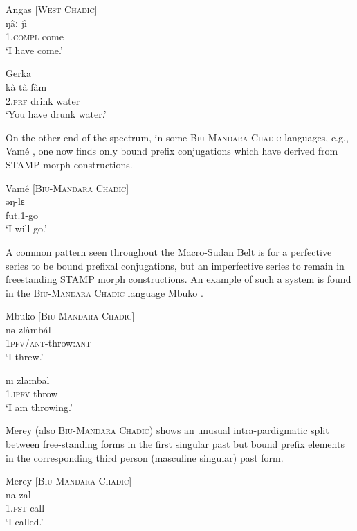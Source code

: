 \documentclass[output=paper]{langsci/langscibook}
\begin{document}
\ea\label{ex:anderson:41}
Angas  \citep[38]{Burquest1973}         [\textsc{West Chadic]}\\
\gll ŋâː    jì\\
1.\textsc{compl}  come\\
\glt  `I have come.'
\z

\ea\label{ex:anderson:42}
Gerka  \citep[173]{Jungraithmayr1968}\\
\gll kà  tà  ƒàm\\
\textsc{2.prf}  drink  water\\
\glt `You have drunk water.'
\z

On the other end of the spectrum, in some \textsc{Biu-Mandara Chadic} languages, e.g., Vamé , one now finds only bound prefix conjugations which have derived from STAMP morph constructions. 

\ea\label{ex:anderson:43}
Vamé  \citep[11]{Kinnaird2006}          [\textsc{Biu-Mandara Chadic}]\\
\gll əŋ-lɛ\\
fut.1-go\\
\glt `I will go.'
\z

A common pattern seen throughout the Macro-Sudan Belt is for a perfective series to be bound prefixal conjugations, but an imperfective series to remain in freestanding STAMP morph constructions. An example of such a system is found in the \textsc{Biu-Mandara Chadic} language Mbuko .

\ea\label{ex:anderson:44}
Mbuko  \citep[7]{Gravina2001}           [\textsc{Biu-Mandara Chadic}]\\
\ea\label{ex:anderson:44a}
\gll nə-zlàmbál    \\
  1\textsc{pfv/ant}-throw:\textsc{ant} \\
\glt `I threw.'    

\ex \label{ex:anderson:44b}
\gll n\={i}  zl\={a}mb\={a}l\\
\textsc{1.ipfv}  throw\\
\glt `I am throwing.'  
\z
\z

Merey (also \textsc{Biu-Mandara Chadic}) shows an unusual intra-pardigmatic split between free-standing forms in the first singular past but bound prefix elements in the corresponding third  person  (masculine singular) past form. 

\ea\label{ex:anderson:45}
Merey  \citep[8]{Gravina2007}          [\textsc{Biu-Mandara Chadic}]\\
\ea\label{ex:anderson:45a}
\gll na    zal      \\
  \textsc{1.pst}    call\\
\glt `I called.'
\end{document}
